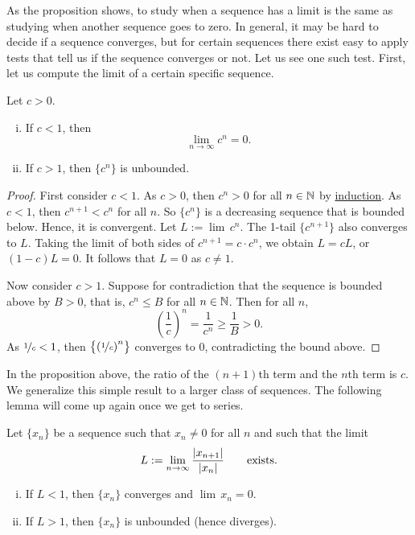 As the proposition shows, to study when a sequence has a limit is 
the same as studying when another sequence goes to zero.
In general, it may be hard to decide if a sequence converges, but
for certain sequences there exist easy to apply tests that tell us
if the sequence converges or not.  Let us see one such test.
First, let
us compute the limit of a certain specific sequence.
\begin{prop}
Let $c > 0$.
\begin{enumerate}[(i)]
\item
If $c < 1$, then
\begin{equation*}
\lim_{n\to\infty} c^n = 0.
\end{equation*}
\item
If $c > 1$, then $\{ c^n \}$ is unbounded.
\end{enumerate}
\end{prop}

\begin{proof}
First consider $c < 1$.  As $c > 0$, then $c^n > 0$ for all $n \in {\mathbb{N}}$ by
\hyperref[induction:thm]{induction}.  As $c < 1$, then $c^{n+1} < c^n$ for all $n$.
So $\{ c^n \}$ is
a decreasing sequence that is bounded below.  Hence, it is convergent.
Let $L := \lim\, c^n$.  The 1-tail $\{ c^{n+1} \}$
also converges to $L$.  Taking the limit of both sides of $c^{n+1} = c \cdot
c^n$, we obtain $L = cL$, or $(1-c)L=0$.  It follows that $L=0$ as $c \not= 1$.

Now consider $c > 1$. Suppose for contradiction that the sequence is bounded above by $B > 0$, that is,
$c^n \leq B$ for all $n \in {\mathbb{N}}$.  Then for all $n$,
\begin{equation*}
{\left(\frac{1}{c}\right)}^n = \frac{1}{c^n} \geq \frac{1}{B} > 0 .
\end{equation*}
As $\nicefrac{1}{c} < 1$, then $\bigl\{ {(\nicefrac{1}{c})}^n \bigr\}$
converges to 0, contradicting the bound above.
\end{proof}

In the proposition above, the
ratio of the $(n+1)$th term and the $n$th term is $c$.  We 
generalize this simple result to a larger class of sequences.
The following lemma will come up again once we get to series.

\begin{lemma}
\label{seq:ratiotest}
Let $\{ x_n \}$ be a sequence such that $x_n \not= 0$ for all $n$ and such that
the limit
\begin{equation*}
L := \lim_{n\to\infty} \frac{\left\lvert {x_{n+1}} \right\rvert}{\left\lvert {x_n} \right\rvert}
\qquad
\text{exists.}
\end{equation*}
\begin{enumerate}[(i)]
\item
If $L < 1$, then $\{ x_n \}$ converges and $\lim\, x_n = 0$.
\item
If $L > 1$, then $\{ x_n \}$ is unbounded (hence diverges).
\end{enumerate}
\end{lemma}

